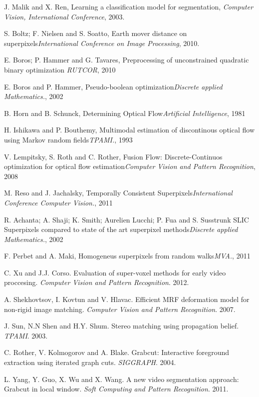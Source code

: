 \begin{thebibliography}{99}

J. Malik and X. Ren, Learning a classification model for segmentation, {\it Computer Vision, International Conference}, 2003.

S. Boltz; F. Nielsen and S. Soatto, Earth mover distance on superpixels{\it International Conference on Image Processing}, 2010.

E. Boros; P. Hammer and G. Tavares, Preprocessing of unconstrained quadratic binary optimization {\it RUTCOR}, 2010

E. Boros and P. Hammer, Pseudo-boolean optimization{\it Discrete applied Mathematics.}, 2002

B. Horn and B. Schunck, Determining Optical Flow{\it Artificial Intelligence}, 1981

H. Ishikawa and P. Bouthemy, Multimodal estimation of discontinous optical flow using Markov random fields{\it TPAMI.}, 1993

V. Lempitsky, S. Roth and C. Rother, Fusion Flow: Discrete-Continuos optimization for optical flow estimation{\it Computer Vision and Pattern Recognition}, 2008

M. Reso and J. Jachalsky, Temporally Consistent Superpixels{\it International Conference Computer Vision.}, 2011

R. Achanta; A. Shaji; K. Smith; Aurelien Lucchi; P. Fua and S. Susstrunk SLIC Superpixels compared to state of the art superpixel methods{\it Discrete applied Mathematics.}, 2002

F. Perbet and A. Maki, Homogeneus superpixels from random walks{\it MVA.}, 2011

C. Xu and J.J. Corso. Evaluation of super-voxel methods for early video proccesing. {\it Computer Vision and Pattern Recognition}. 2012.

A. Shekhovtsov, I. Kovtun and V. Hlavac. Efficient MRF deformation model for non-rigid image matching. {\it Computer Vision and Pattern Recognition}. 2007.

J. Sun, N.N Shen and H.Y. Shum. Stereo matching using propagation belief. {\it TPAMI}. 2003.

C. Rother, V. Kolmogorov and A. Blake. Grabcut: Interactive foreground extraction using iterated graph cuts. {\it SIGGRAPH}. 2004.

L. Yang, Y. Guo, X. Wu and X. Wang. A new video segmentation approach: Grabcut in local window. {\it Soft Computing and Pattern Recognition}. 2011.


\end{thebibliography}

